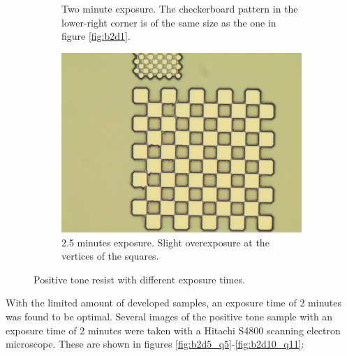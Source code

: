 \begin{figure}[ht]
\begin{subfigure}[t]{0.3\linewidth}
        \caption{Two minute exposure. The checkerboard pattern in the lower-right corner is of the same size as the one in figure \ref{fig:b2d1}.}
        \label{fig:b3a1}
    \end{subfigure}
    \hfill
    \begin{subfigure}[t]{0.3\linewidth}
        \centering
        \includegraphics[width=\textwidth]{data/b3e1.jpg}
        \caption{2.5 minutes exposure. Slight overexposure at the vertices of the squares.}
        \label{fig:b3e1}
    \end{subfigure}
    \hfill
    \caption{Positive tone resist with different exposure times.}
\end{figure}

With the limited amount of developed samples, an exposure time of 2 minutes was found to be optimal. Several images of the positive tone sample with an exposure time of 2 minutes were taken with a Hitachi S4800 scanning electron microscope. These are shown in figures \ref{fig:b2d5_q5}-\ref{fig:b2d10_q11}:

